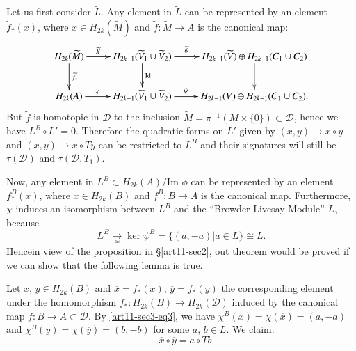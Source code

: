 Let us first consider $\widetilde{L}$. Any element in $\widetilde{L}$ can be represented by an element $\widetilde{f}_{*}(x)$, where $x\in H_{2k}(\widetilde{M})$ and $\widetilde{f}:\widetilde{M}\to A$ is the canonical map:
\[
\xymatrix{
H_{2k}(\widetilde{M})\ar[d]^-{\widetilde{f}_{*}}\ar[r]^-{\widetilde{\chi}} & H_{2k-1}(\widetilde{V}_{1}\cup \widetilde{V}_{2})\ar[d]^-{\text{Id}}\ar[r]^-{\widetilde{\psi}} & H_{2k-1}(\widetilde{V})\oplus H_{2k-1}(C_{1}\cup C_{2})\ar[d]\\
H_{2k}(A)\ar[r]^-{\chi} & H_{2k-1}(\widetilde{V}_{1}\cup \widetilde{V}_{2})\ar[r]^-{\psi} & H_{2k-1}(V)\oplus H_{2k-1}(C_{1}\cup C_{2}).
}
\]
But $\widetilde{f}$ is homotopic in $\mathscr{D}$ to the inclusion $\widetilde{M}=\pi^{-1}(M\times \{0\})\subset \mathscr{D}$, hence we have $L^{B}\circ L'=0$. Therefore the quadratic forms on $L'$ given by $(x,y)\to x\circ y$ and $(x,y)\to x\circ Ty$ can be restricted to $L^{B}$ and their signatures will still be $\tau(\mathscr{D})$ and $\tau(\mathscr{D},T_{1})$.

Now, any element in $L^{B}\subset H_{2k}(A)/\text{Im~}\phi$ can be represented by an element $f^{B}_{*}(x)$, where $x\in H_{2k}(B)$ and $f^{B}:B\to A$ is the canonical map. Furthermore, $\chi$ induces an isomorphism between $L^{B}$ and the ``Browder-Livesay Module'' $L$, because
$$
L^{B}\xrightarrow[\cong]{} \ker \psi^{B}=\{(a,-a) | a\in L\}\cong L.
$$
Hence\pageoriginale in view of the proposition in \S\ref{art11-sec2}, out theorem would be proved if we can show that the following lemma is true.

\begin{lemma*}
Let $x$, $y\in H_{2k}(B)$ and $\overline{x}=f_{*}(x)$, $\overline{y}=f_{*}(y)$ the corresponding element under the homomorphism $f_{*}:H_{2k}(B)\to H_{2k}(\mathscr{D})$ induced by the canonical map $f:B\to A\subset \mathscr{D}$. By \eqref{art11-sec3-eq3}, we have $\chi^{B}(x)=\chi(\overline{x})=(a,-a)$ and $\chi^{B}(y)=\chi(\overline{y})=(b,-b)$ for some $a$, $b\in L$. We claim:
\begin{equation*}
-\overline{x}\circ \overline{y}=a\circ Tb\tag{4}\label{art11-sec3-eq4}
\end{equation*}
\end{lemma*}

